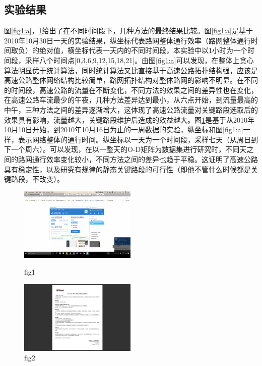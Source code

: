 			\subsection{实验结果}
				图\ref{fig1:a}，\ref{fig1:b}给出了在不同时间段下，几种方法的最终结果比较。图\ref{fig1:a}是基于2010年10月30日一天的实验结果，纵坐标代表路网整体通行效率（路网整体通行时间取负）的绝对值，横坐标代表一天内的不同时间段，本实验中以1小时为一个时间段，采样八个时间点[0,3,6,9,12,15,18,21]。由图\ref{fig1:a}可以发现，在整体上贪心算法明显优于统计算法，同时统计算法又比直接基于高速公路拓扑结构强，应该是高速公路整体网络结构比较简单，路网拓扑结构对整体路网的影响不明显。在不同的时间段，高速公路的流量在不断变化，不同方法的效果之间的差异性也在变化，在高速公路车流最少的午夜，几种方法差异达到最小，从六点开始，到流量最高的中午，三种方法之间的差异逐渐增大，这体现了高速公路流量对关键路段选取后的效果具有影响，流量越大，关键路段维护后造成的效益越大。图\ref{fig1:b}是基于从2010年10月10日开始，到2010年10月16日为止的一周数据的实验，纵坐标和图\ref{fig1:a}一样，表示网络整体的通行时间。纵坐标以一天为一个时间段，采样七天（从周日到下一个周六）。可以发现，在以一整天的O-D矩阵为数据集进行研究时，不同天之间的路网通行效率变化较小，不同方法之间的差异也趋于平稳。这证明了高速公路具有稳定性，以及研究有规律的静态关键路段的可行性（即他不管什么时候都是关键路段，不改变）。



				\begin{figure}
				\begin{minipage}{0.5\linewidth}
					\centering
					\includegraphics[width=2.2in]{picture/test}
					\caption{fig1}
					\label{fig1:a}
				\end{minipage}%
				\begin{minipage}{0.5\linewidth}
					\centering
					\includegraphics[width=2.2in]{picture/test1}
					\caption{fig2}
					\label{fig1:b}
				\end{minipage}
				\end{figure}

